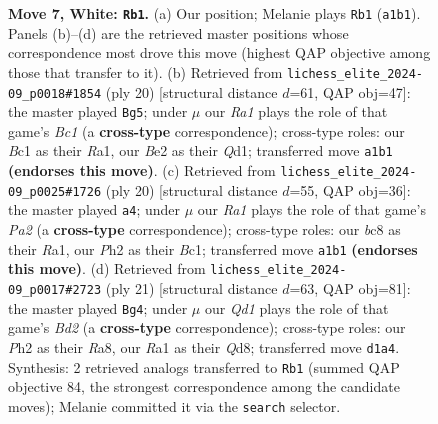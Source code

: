 \documentclass[11pt]{article}
\begin{document}
\begin{figure}[p]
\caption{\textbf{Move 7, White: \texttt{Rb1}.} (a) Our position; Melanie plays \texttt{Rb1} (\texttt{a1b1}). Panels (b)--(d) are the retrieved master positions whose correspondence most drove this move (highest QAP objective among those that transfer to it). (b) Retrieved from \texttt{lichess\_elite\_2024-09\_p0018\#1854} (ply 20) [structural distance $d$=61, QAP obj=47]: the master played \texttt{Bg5}; under $\mu$ our \emph{Ra1} plays the role of that game's \emph{Bc1} (a \textbf{cross-type} correspondence); cross-type roles: our \emph{B}c1 as their \emph{R}a1, our \emph{B}e2 as their \emph{Q}d1; transferred move \texttt{a1b1} \textbf{(endorses this move)}. (c) Retrieved from \texttt{lichess\_elite\_2024-09\_p0025\#1726} (ply 20) [structural distance $d$=55, QAP obj=36]: the master played \texttt{a4}; under $\mu$ our \emph{Ra1} plays the role of that game's \emph{Pa2} (a \textbf{cross-type} correspondence); cross-type roles: our \emph{b}c8 as their \emph{R}a1, our \emph{P}h2 as their \emph{B}c1; transferred move \texttt{a1b1} \textbf{(endorses this move)}. (d) Retrieved from \texttt{lichess\_elite\_2024-09\_p0017\#2723} (ply 21) [structural distance $d$=63, QAP obj=81]: the master played \texttt{Bg4}; under $\mu$ our \emph{Qd1} plays the role of that game's \emph{Bd2} (a \textbf{cross-type} correspondence); cross-type roles: our \emph{P}h2 as their \emph{R}a8, our \emph{R}a1 as their \emph{Q}d8; transferred move \texttt{d1a4}. Synthesis: 2 retrieved analogs transferred to \texttt{Rb1} (summed QAP objective 84, the strongest correspondence among the candidate moves); Melanie committed it via the \texttt{search} selector.}
\label{fig:thought-m12}
\end{figure}

\clearpage
\end{document}
